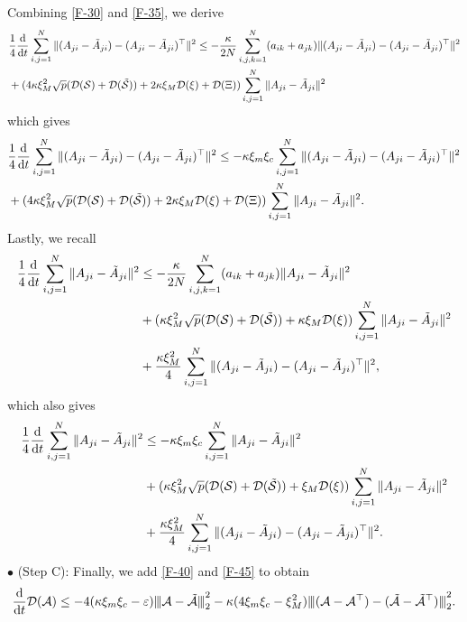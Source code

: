 \documentclass[11pt,reqno]{amsart}
\numberwithin{figure}{section}
\newcommand{\opnorm}[1]{{ \vert\kern-0.25ex \vert\kern-0.25ex \vert #1 
     \vert\kern-0.25ex \vert\kern-0.25ex \vert}}
\newcommand{\kp}{\kappa}
\newcommand{\veps}{\varepsilon}
\newcommand{\dd}{  {\textup{d}} }
\newcommand{\dt} {    {  \textup{d}t   }    }
\begin{document}
 Combining \eqref{F-30} and \eqref{F-35}, we derive 
\begin{align*}
&\frac14 \frac\dd\dt \sum_{i,j=1}^N \| (A_{ji} - \tilde A_{ji}) - (A_{ji} - \tilde A_{ji})^\top \|^2  \leq -\frac{\kp}{2N}  \sum_{i,j,k=1}^N (a_{ik} + a_{jk}) \| (A_{ji} - \tilde A_{ji}) - (A_{ji} - \tilde A_{ji})^\top \|^2 \\
& +(  4\kp \xi_M^2 \sqrt p (\mathcal D(\mathcal S) + \mathcal D(\tilde{\mathcal S})) + 2\kp\xi_M\mathcal D(\xi) + \mathcal D(\Xi)       )  \sum_{i,j=1}^N \|A_{ji} - \tilde A_{ji}\|^2 
\end{align*}
which gives
\begin{align} \label{F-40}
\begin{aligned}
&\frac14 \frac\dd\dt \sum_{i,j=1}^N \| (A_{ji} - \tilde A_{ji}) - (A_{ji} - \tilde A_{ji})^\top \|^2  \leq - \kp \xi_m \xi_c \sum_{i,j=1}^N  \| (A_{ji} - \tilde A_{ji}) - (A_{ji} - \tilde A_{ji})^\top \|^2 \\
& +(  4\kp \xi_M^2 \sqrt p (\mathcal D(\mathcal S) + \mathcal D(\tilde{\mathcal S})) + 2\kp \xi_M\mathcal D(\xi) + \mathcal D(\Xi)       )  \sum_{i,j=1}^N \|A_{ji} - \tilde A_{ji}\|^2 .
\end{aligned}
\end{align}
 Lastly, we recall
 \begin{align*}
\frac14\frac\dd\dt \sum_{i,j=1}^N \|A_{ji} - \tilde A_{ji}\|^2 & \leq -\frac{\kp}{2 N }\sum_{i,j,k=1}^N (a_{ik} + a_{jk}) \|A_{ji} - \tilde A_{ji}\|^2  \\
& +   (\kp \xi_M^2 \sqrt p(\mathcal D(\mathcal S)  + \mathcal D(\tilde{\mathcal S})) + \kp \xi_M \mathcal D(\xi))  \sum_{i,j=1}^N \|A_{ji} - \tilde A_{ji}\|^2 \\
& + \frac {\kappa \xi_M^2}{4} \sum_{i,j=1}^N \| (A_{ji} - \tilde A_{ji} ) - (A_{ji} - \tilde A_{ji})^\top\|^2,
\end{align*}
which also gives
 \begin{align} \label{F-45}
 \begin{aligned}
\frac14\frac\dd\dt \sum_{i,j=1}^N \|A_{ji} - \tilde A_{ji}\|^2 & \leq -\kp\xi_m \xi_c \sum_{i,j=1}^N  \|A_{ji} - \tilde A_{ji}\|^2  \\
& +   (\kp \xi_M^2 \sqrt p(\mathcal D(\mathcal S)  + \mathcal D(\tilde{\mathcal S})) + \xi_M \mathcal D(\xi))  \sum_{i,j=1}^N \|A_{ji} - \tilde A_{ji}\|^2 \\
& + \frac {\kappa \xi_M^2}{4} \sum_{i,j=1}^N \| (A_{ji} - \tilde A_{ji} ) - (A_{ji} - \tilde A_{ji})^\top\|^2.
\end{aligned}
\end{align}
$\bullet$ (Step C): Finally, we add \eqref{F-40} and \eqref{F-45} to obtain
\[
\frac\dd\dt \mathcal D(\mathcal A) \leq  -4 (\kp \xi_m\xi_c - \veps) \opnorm{\mathcal A- \tilde{\mathcal A}}_2^2 -\kp ( 4\xi_m \xi_c - \xi_M^2) \opnorm{(\mathcal A - \mathcal A^\top) - (\tilde{\mathcal A} - \tilde{\mathcal A}^\top)   }_2^2.
\]
\end{document}
